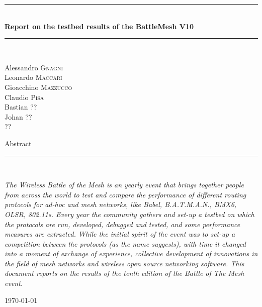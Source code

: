\documentclass[10pt,onecolumn]{paper}
\newcommand{\HRule}{\rule{\linewidth}{0.5mm}}
\begin{document}
\begin{titlepage}
\begin{center}

\HRule \\[0.4cm]
{ \huge \bfseries Report on the testbed results of the BattleMesh V10 \\[0.4cm] }

\HRule \\[1.5cm]

\begin{minipage}{0.4\textwidth}
\begin{flushleft} \large
Alessandro \textsc{Gnagni}\\
Leonardo \textsc{Maccari}\\
Gioacchino \textsc{Mazzucco}\\
Claudio \textsc{Pisa}\\
Bastian \textsc{??}\\
Johan \textsc{??}\\
 \textsc{??}\\
\end{flushleft}
\end{minipage}
\begin{minipage}{0.4\textwidth}
\end{minipage}

\vfill
{\large Abstract}
\HRule \\[0.4cm]
\begin{flushleft}
\emph{The Wireless Battle of the Mesh is an yearly event that brings together
people from across the world to test and compare the performance of different routing
protocols for ad-hoc and mesh networks, like Babel, B.A.T.M.A.N., BMX6, OLSR,
802.11s. Every year the community gathers and set-up a testbed on which the
protocols are run, developed, debugged and tested, and some performance
measures are extracted. While the initial spirit of the event was to set-up a
competition between the protocols (as the name suggests), with time it changed
into a moment of exchange of experience, collective development of
innovations in the field of mesh networks and wireless open source
networking software. This document reports on the results of the tenth edition
of the Battle of The Mesh event.}
\end{flushleft}
\vskip2cm

\vfill

{\large \today}

\end{center}
\end{titlepage}
\end{document}
